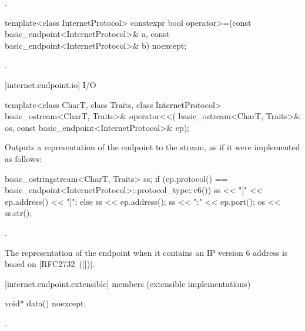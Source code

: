 \begin{itemdescr}
\pnum
\returns {}.
\end{itemdescr}

\begin{itemdecl}
template<class InternetProtocol>
  constexpr bool operator>=(const basic_endpoint<InternetProtocol>& a,
                            const basic_endpoint<InternetProtocol>& b) noexcept;
\end{itemdecl}

\begin{itemdescr}
\pnum
\returns {}.
\end{itemdescr}



[internet.endpoint.io]{ I/O}

\begin{itemdecl}
template<class CharT, class Traits, class InternetProtocol>
  basic_ostream<CharT, Traits>& operator<<(
    basic_ostream<CharT, Traits>& os,
    const basic_endpoint<InternetProtocol>& ep);
\end{itemdecl}

\begin{itemdescr}
\pnum
\effects Outputs a representation of the endpoint to the stream, as if it were implemented as follows: 
\begin{codeblock}
basic_ostringstream<CharT, Traits> ss;
if (ep.protocol() == basic_endpoint<InternetProtocol>::protocol_type::v6())
  ss << "[" << ep.address() << "]";
else
  ss << ep.address();
ss << ":" << ep.port();
os << ss.str();
\end{codeblock}


\pnum
\returns {}.
\end{itemdescr}

\pnum
\enternote The representation of the endpoint when it contains an IP version 6 address is based on [RFC2732~(\ref{})]. \exitnote



[internet.endpoint.extensible]{ members (extensible implementations)}

\begin{itemdecl}
void* data() noexcept;
\end{itemdecl}

\begin{itemdescr}
\pnum
\returns {}.
\end{itemdescr}

